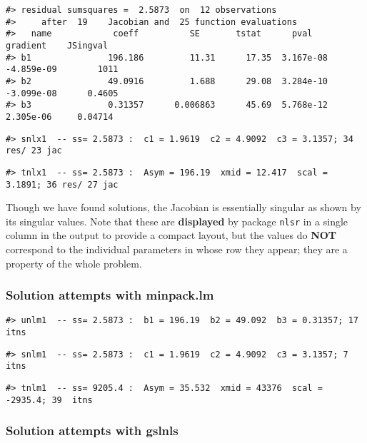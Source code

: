 \begin{verbatim}
#> residual sumsquares =  2.5873  on  12 observations
#>     after  19    Jacobian and  25 function evaluations
#>   name            coeff          SE       tstat      pval      gradient    JSingval   
#> b1               196.186         11.31      17.35  3.167e-08  -4.859e-09        1011  
#> b2               49.0916         1.688      29.08  3.284e-10  -3.099e-08      0.4605  
#> b3               0.31357      0.006863      45.69  5.768e-12   2.305e-06     0.04714
\end{verbatim}

\begin{verbatim}
#> snlx1  -- ss= 2.5873 :  c1 = 1.9619  c2 = 4.9092  c3 = 3.1357; 34 res/ 23 jac
\end{verbatim}

\begin{verbatim}
#> tnlx1  -- ss= 2.5873 :  Asym = 196.19  xmid = 12.417  scal = 3.1891; 36 res/ 27 jac
\end{verbatim}

Though we have found solutions, the Jacobian is essentially singular as
shown by its singular
values. Note that these are \textbf{displayed} by package \texttt{nlsr} in a single column in
the output to provide a compact layout, but the values do \textbf{NOT} correspond to
the individual parameters in
whose row they appear; they are a property of the whole problem.

\hypertarget{solution-attempts-with-minpack.lm}{%
\subsubsection{Solution attempts with minpack.lm}\label{solution-attempts-with-minpack.lm}}

\begin{verbatim}
#> unlm1  -- ss= 2.5873 :  b1 = 196.19  b2 = 49.092  b3 = 0.31357; 17  itns
\end{verbatim}

\begin{verbatim}
#> snlm1  -- ss= 2.5873 :  c1 = 1.9619  c2 = 4.9092  c3 = 3.1357; 7  itns
\end{verbatim}

\begin{verbatim}
#> tnlm1  -- ss= 9205.4 :  Asym = 35.532  xmid = 43376  scal = -2935.4; 39  itns
\end{verbatim}

\hypertarget{solution-attempts-with-gslnls}{%
\subsubsection{Solution attempts with gslnls}\label{solution-attempts-with-gslnls}}

